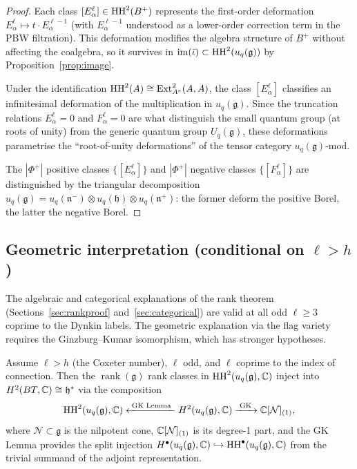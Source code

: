 \begin{proof}
Each class $[E_\alpha^\ell] \in \operatorname{HH}^2(B^+)$ represents the first-order deformation $E_\alpha^\ell \mapsto t \cdot E_\alpha^{\ell - 1}$ (with $E_\alpha^{\ell - 1}$ understood as a lower-order correction term in the PBW filtration). This deformation modifies the algebra structure of $B^+$ without affecting the coalgebra, so it survives in $\operatorname{im}(\bar\iota) \subset \operatorname{HH}^2(u_q(\mathfrak{g}))$ by Proposition~\ref{prop:image}.

Under the identification $\operatorname{HH}^2(A) \cong \operatorname{Ext}^2_{A^e}(A, A)$, the class $[E_\alpha^\ell]$ classifies an infinitesimal deformation of the multiplication in $u_q(\mathfrak{g})$. Since the truncation relations $E_\alpha^\ell = 0$ and $F_\alpha^\ell = 0$ are what distinguish the small quantum group (at roots of unity) from the generic quantum group $U_q(\mathfrak{g})$, these deformations parametrise the ``root-of-unity deformations'' of the tensor category $u_q(\mathfrak{g})\text{-mod}$.

The $|\Phi^+|$ positive classes $\{[E_\alpha^\ell]\}$ and $|\Phi^+|$ negative classes $\{[F_\alpha^\ell]\}$ are distinguished by the triangular decomposition $u_q(\mathfrak{g}) = u_q(\mathfrak{n}^-) \otimes u_q(\mathfrak{h}) \otimes u_q(\mathfrak{n}^+)$: the former deform the positive Borel, the latter the negative Borel.
\end{proof}

\subsection{Geometric interpretation (conditional on \texorpdfstring{$\ell > h$}{ell > h})}
\label{sec:geometric}

The algebraic and categorical explanations of the rank theorem (Sections~\ref{sec:rankproof} and~\ref{sec:categorical}) are valid at all odd $\ell \geq 3$ coprime to the Dynkin labels. The geometric explanation via the flag variety requires the Ginzburg--Kumar isomorphism, which has stronger hypotheses.

\begin{proposition}
\label{prop:georank}
Assume $\ell > h$ (the Coxeter number), $\ell$ odd, and $\ell$ coprime to the index of connection. Then the $\operatorname{rank}(\mathfrak{g})$ rank classes in $\operatorname{HH}^2(u_q(\mathfrak{g}), \mathbb{C})$ inject into $H^2(BT, \mathbb{C}) \cong \mathfrak{h}^*$ via the composition
\[
\operatorname{HH}^2(u_q(\mathfrak{g}), \mathbb{C}) \xleftarrow{\;\text{GK Lemma}\;} H^2(u_q(\mathfrak{g}), \mathbb{C}) \xrightarrow{\;\text{GK}\;} \mathbb{C}[\mathcal{N}]_{(1)},
\]
where $\mathcal{N} \subset \mathfrak{g}$ is the nilpotent cone, $\mathbb{C}[\mathcal{N}]_{(1)}$ is its degree-1 part, and the GK Lemma provides the split injection $H^\bullet(u_q(\mathfrak{g}), \mathbb{C}) \hookrightarrow \operatorname{HH}^\bullet(u_q(\mathfrak{g}), \mathbb{C})$ from the trivial summand of the adjoint representation.
\end{proposition}

